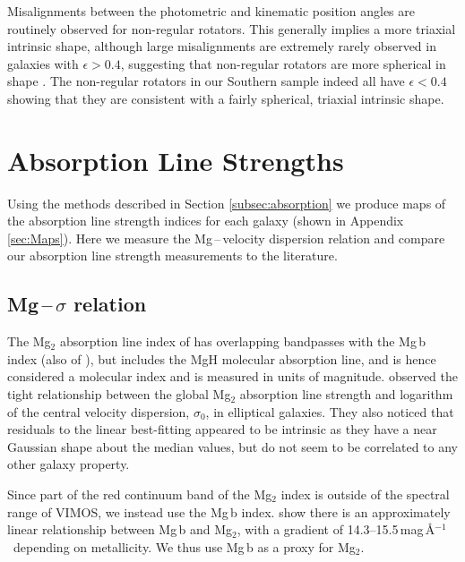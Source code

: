 \documentclass[a4paper,fleqn,usenatbib]{mnras}
\begin{document}
		Misalignments between the photometric and kinematic position angles are routinely observed for non-regular rotators. This generally implies a more triaxial intrinsic shape, although large misalignments are extremely rarely observed in galaxies with $\epsilon > 0.4$, suggesting that non-regular rotators are more spherical in shape \citep{Cappellari2016}. The non-regular rotators in our Southern sample indeed all have $\epsilon < 0.4$ showing that they are consistent with a fairly spherical, triaxial intrinsic shape.

\section{Absorption Line Strengths}
	\label{sec:absorption}
	Using the methods described in Section \ref{subsec:absorption} we produce maps of the absorption line strength indices for each galaxy (shown in Appendix \ref{sec:Maps}). Here we measure the Mg\,--\,velocity dispersion relation and compare our absorption line strength measurements to the literature. 

	\subsection{Mg\,--\,$\sigma$ relation}
		\label{subsec:Mgsigma}
		The Mg$_2$ absorption line index of \citet{Trager1998} has overlapping bandpasses with the Mg\,b index (also of \citeauthor{Trager1998}), but includes the MgH molecular absorption line, and is hence considered a molecular index and is measured in units of magnitude. \citet{Bender1993} observed the tight relationship between the global Mg$_2$ absorption line strength and logarithm of the central velocity dispersion, $\sigma_0$, in elliptical galaxies. They also noticed that residuals to the linear best-fitting appeared to be intrinsic as they have a near Gaussian shape about the median values, but do not seem to be correlated to any other galaxy property. 

		Since part of the red continuum band of the Mg$_2$ index is outside of the spectral range of VIMOS, we instead use the Mg\,b index. \citet{Ziegler1997} show there is an approximately linear relationship between Mg\,b and Mg$_2$, with a gradient of 14.3--15.5\,mag\,\AA$^{-1}$\ depending on metallicity. We thus use Mg\,b as a proxy for Mg$_2$. 
\end{document}
